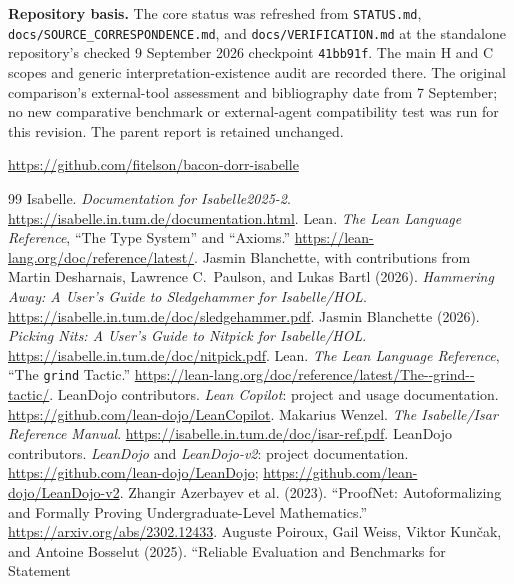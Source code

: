 \documentclass[12pt,leqno]{article}
\newcommand{\isa}[1]{\nolinkurl{#1}}
\begin{document}
\medskip
\begin{singlespace}
\small
\noindent\textbf{Repository basis.} The core status was refreshed from
\isa{STATUS.md}, \isa{docs/SOURCE_CORRESPONDENCE.md}, and
\isa{docs/VERIFICATION.md} at the standalone repository's checked
9 September 2026 checkpoint \isa{41bb91f}. The main H and C scopes and
generic interpretation-existence audit are recorded there. The original
comparison's external-tool assessment and bibliography date from
7 September; no new comparative benchmark or external-agent compatibility
test was run for this revision. The parent report is retained unchanged.
\par\smallskip
\url{https://github.com/fitelson/bacon-dorr-isabelle}
\end{singlespace}

\bigskip
\begin{singlespace}
\footnotesize
\raggedright
\begin{thebibliography}{99}
 Isabelle. \emph{Documentation for Isabelle2025-2}.
\url{https://isabelle.in.tum.de/documentation.html}.
 Lean. \emph{The Lean Language Reference}, ``The Type
System'' and ``Axioms.''
\url{https://lean-lang.org/doc/reference/latest/}.
 Jasmin Blanchette, with contributions from Martin
Desharnais, Lawrence C.\ Paulson, and Lukas Bartl (2026).
\emph{Hammering Away: A User's Guide to Sledgehammer for Isabelle/HOL}.
\url{https://isabelle.in.tum.de/doc/sledgehammer.pdf}.
 Jasmin Blanchette (2026).
\emph{Picking Nits: A User's Guide to Nitpick for Isabelle/HOL}.
\url{https://isabelle.in.tum.de/doc/nitpick.pdf}.
 Lean. \emph{The Lean Language Reference}, ``The
\isa{grind} Tactic.''
\url{https://lean-lang.org/doc/reference/latest/The--grind--tactic/}.
 LeanDojo contributors. \emph{Lean Copilot}: project and
usage documentation. \url{https://github.com/lean-dojo/LeanCopilot}.
 Makarius Wenzel. \emph{The Isabelle/Isar Reference Manual}.
\url{https://isabelle.in.tum.de/doc/isar-ref.pdf}.
 LeanDojo contributors. \emph{LeanDojo} and
\emph{LeanDojo-v2}: project documentation.
\url{https://github.com/lean-dojo/LeanDojo};
\url{https://github.com/lean-dojo/LeanDojo-v2}.
 Zhangir Azerbayev et al. (2023).
``ProofNet: Autoformalizing and Formally Proving Undergraduate-Level
Mathematics.'' \url{https://arxiv.org/abs/2302.12433}.
 Auguste Poiroux, Gail Weiss, Viktor Kun\v{c}ak, and
Antoine Bosselut (2025). ``Reliable Evaluation and Benchmarks for Statement

\end{thebibliography}
\end{singlespace}
\end{document}
